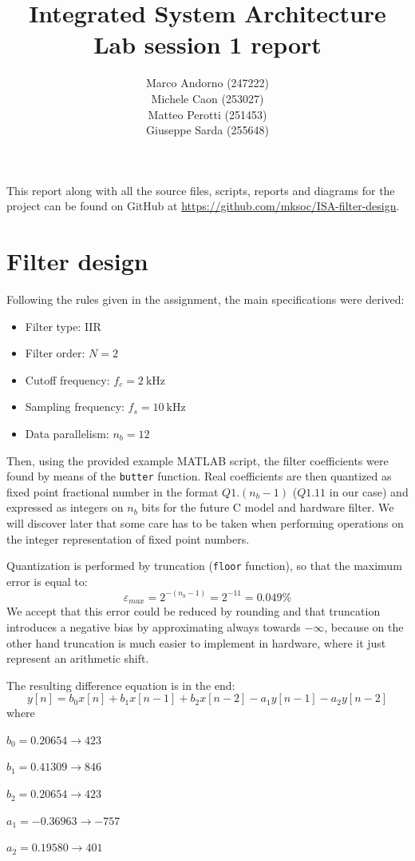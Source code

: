 \documentclass[a4paper]{article}
\title{Integrated System Architecture \\ Lab session 1 report}
\author{Marco Andorno (247222)\\ Michele Caon (253027) \\ Matteo Perotti (251453) \\ Giuseppe Sarda (255648)}
\begin{document}
\maketitle

This report along with all the source files, scripts, reports and diagrams for the project can be found on GitHub at \url{https://github.com/mksoc/ISA-filter-design}.
\tableofcontents

\section{Filter design}
Following the rules given in the assignment, the main specifications were derived:
\begin{itemize}
    \item Filter type: IIR
    \item Filter order: \(N = 2\)
    \item Cutoff frequency: $f_c = \SI{2}{\kilo\hertz}$
    \item Sampling frequency: $f_s = \SI{10}{\kilo\hertz}$
    \item Data parallelism: $n_b = 12$
\end{itemize}
Then, using the provided example MATLAB script, the filter coefficients were found by means of the \texttt{butter} function. Real coefficients are then quantized as fixed point fractional number in the format $Q1.(n_b-1)$ ($Q1.11$ in our case) and expressed as integers on $n_b$ bits for the future C model and hardware filter. We will discover later that some care has to be taken when performing operations on the integer representation of fixed point numbers. 

Quantization is performed by truncation (\texttt{floor} function), so that the maximum error is equal to:
\begin{equation}\label{eq:emax}
    \varepsilon_{max} = 2^{-(n_b-1)} = 2^{-11} = 0.049\%
\end{equation}
We accept that this error could be reduced by rounding and that truncation introduces a negative bias by approximating always towards \(-\infty\), because on the other hand truncation is much easier to implement in hardware, where it just represent an arithmetic shift.

The resulting difference equation is in the end:
\begin{equation}\label{eq:diff}
    y[n] = b_0x[n] + b_1x[n-1] + b_2x[n-2] - a_1y[n-1] - a_2y[n-2]
\end{equation}
where
\begin{description}
    \item \(b_0 = 0.20654 \rightarrow 423\)
    \item \(b_1 = 0.41309 \rightarrow 846\)
    \item \(b_2 = 0.20654 \rightarrow  423\)
    \item \(a_1 = -0.36963 \rightarrow  -757\)
    \item \(a_2 = 0.19580 \rightarrow  401\)
\end{description}
\end{document}
